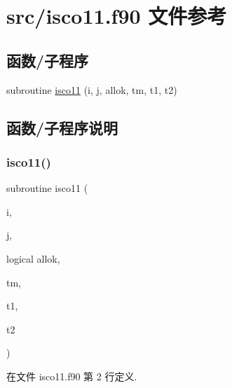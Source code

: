 \hypertarget{isco11_8f90}{}\section{src/isco11.f90 文件参考}
\label{isco11_8f90}
\subsection*{函数/子程序}
\begin{DoxyCompactItemize}
\item 
subroutine \mbox{\hyperlink{isco11_8f90_a5cbe0a24fa3ffefc5968f91bbc94b877}{isco11}} (i, j, allok, tm, t1, t2)
\end{DoxyCompactItemize}


\subsection{函数/子程序说明}
\mbox{\label{isco11_8f90_a5cbe0a24fa3ffefc5968f91bbc94b877}} 
\subsubsection{\texorpdfstring{isco11()}{isco11()}}
{\footnotesize\ttfamily subroutine isco11 (\begin{DoxyParamCaption}\item[{}]{i,  }\item[{}]{j,  }\item[{logical}]{allok,  }\item[{}]{tm,  }\item[{}]{t1,  }\item[{}]{t2 }\end{DoxyParamCaption})}



在文件 isco11.\+f90 第 2 行定义.

